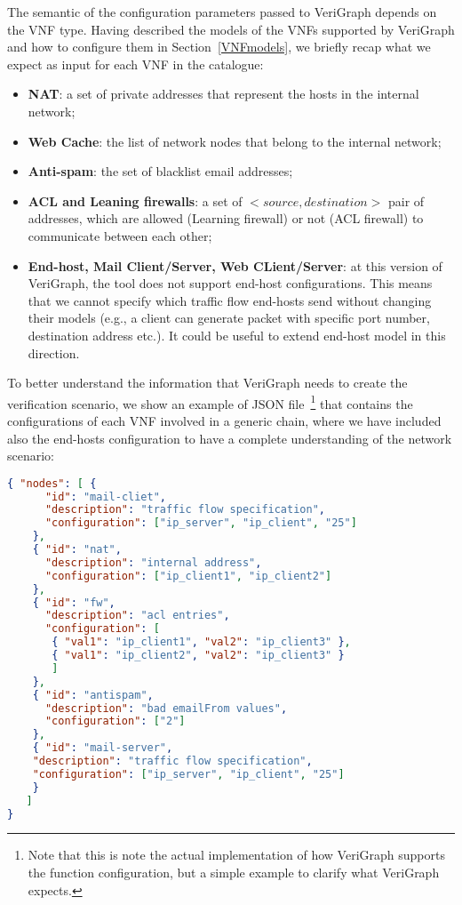 The semantic of the configuration parameters passed to VeriGraph depends on the VNF type. Having described the models of the VNFs supported by VeriGraph and how to configure them in Section~\ref{VNFmodels}, we briefly recap what we expect as input for each VNF in the catalogue:
\begin{itemize}
	\item \textbf{NAT}: a set of private addresses that represent the hosts in the internal network; 
	\item \textbf{Web Cache}: the list of network nodes that belong to the internal network;
	\item \textbf{Anti-spam}: the set of blacklist email addresses;
	\item \textbf{ACL and Leaning firewalls}: a set of \textit{$<source, destination>$} pair of addresses, which are allowed (Learning firewall) or not (ACL firewall) to communicate between each other;
	\item \textbf{End-host, Mail Client/Server, Web CLient/Server}: at this version of VeriGraph, the tool does not support end-host configurations. This means that we cannot specify which traffic flow end-hosts send without changing their models (e.g., a client can generate packet with specific port number, destination address etc.). It could be useful to extend end-host model in this direction.
\end{itemize}

To better understand the information that VeriGraph needs to create the verification scenario, we show an example of JSON file~\footnote{Note that this is note the actual implementation of how VeriGraph supports the function configuration, but a simple example to clarify what VeriGraph expects.} that contains the configurations of each VNF involved in a generic chain, where we have included also the end-hosts configuration to have a complete understanding of the network scenario:
\begin{lstlisting}[language=json,firstnumber=1]
{ "nodes": [ {
      "id": "mail-cliet",
      "description": "traffic flow specification",
      "configuration": ["ip_server", "ip_client", "25"]
	},
    { "id": "nat",
      "description": "internal address",
      "configuration": ["ip_client1", "ip_client2"]
    },
    { "id": "fw",
      "description": "acl entries",
      "configuration": [
       { "val1": "ip_client1", "val2": "ip_client3" },
       { "val1": "ip_client2", "val2": "ip_client3" }
       ]
    },
    { "id": "antispam",
      "description": "bad emailFrom values",
      "configuration": ["2"]
    },
    { "id": "mail-server",
    "description": "traffic flow specification",
    "configuration": ["ip_server", "ip_client", "25"]
    }
   ]
}
\end{lstlisting}